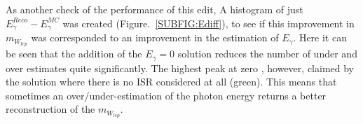 \\\\
As another check of the performance of this edit, A histogram of just $E_{\gamma}^{Reco} - E_{\gamma}^{MC}$ was created (Figure.~\ref{SUBFIG:Ediff}), to see if this improvement in ${m}_{W_{lep}}$ was corresponded to an improvement in the estimation of $E_{\gamma}$. Here it can be seen that the addition of the $E_{\gamma} = 0$ solution  reduces the number of under and over estimates quite significantly. The highest peak at zero , however, claimed by the solution where there is no ISR considered at all (green). This means that sometimes an over/under-estimation of the photon energy returns a better reconstruction of the ${m}_{W_{lep}}$.

